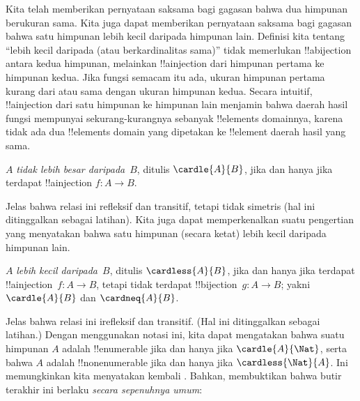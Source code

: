 \documentclass[../../../include/open-logic-section]{subfiles}
\begin{document}


\begin{explain}
Kita telah memberikan pernyataan saksama bagi gagasan bahwa dua himpunan
berukuran sama. Kita juga dapat memberikan pernyataan saksama bagi gagasan
bahwa satu himpunan lebih kecil daripada himpunan lain. Definisi kita tentang
``lebih kecil daripada (atau berkardinalitas sama)'' tidak memerlukan
!!a{bijection} antara kedua himpunan, melainkan !!a{injection} dari himpunan
pertama ke himpunan kedua. Jika fungsi semacam itu ada, ukuran himpunan pertama
kurang dari atau sama dengan ukuran himpunan kedua. Secara intuitif,
!!a{injection} dari satu himpunan ke himpunan lain menjamin bahwa daerah hasil
fungsi mempunyai sekurang-kurangnya sebanyak !!{element}s domainnya, karena
tidak ada dua !!{element}s domain yang dipetakan ke !!{element} daerah hasil
yang sama.
\end{explain}

\begin{defn}
$A$ \emph{tidak lebih besar daripada}~$B$, ditulis $\cardle{A}{B}$, jika dan
hanya jika terdapat !!a{injection} $f \colon A \to B$.
\end{defn}

Jelas bahwa relasi ini refleksif dan transitif, tetapi tidak simetris (hal ini
ditinggalkan sebagai latihan). Kita juga dapat memperkenalkan suatu pengertian
yang menyatakan bahwa satu himpunan (secara ketat) lebih kecil daripada
himpunan lain.

\begin{defn}
$A$ \emph{lebih kecil daripada}~$B$, ditulis $\cardless{A}{B}$, jika dan hanya
jika terdapat !!a{injection}~$f\colon A \to B$, tetapi tidak terdapat
!!{bijection}~$g\colon A \to B$; yakni $\cardle{A}{B}$ dan
$\cardneq{A}{B}$.
\end{defn}

Jelas bahwa relasi ini irefleksif dan transitif. (Hal ini ditinggalkan sebagai
latihan.) Dengan menggunakan notasi ini, kita dapat mengatakan bahwa suatu
himpunan $A$ adalah !!{enumerable} jika dan hanya jika $\cardle{A}{\Nat}$,
serta bahwa $A$ adalah !!{nonenumerable} jika dan hanya jika
$\cardless{\Nat}{A}$. Ini memungkinkan kita menyatakan kembali
. Bahkan,
\citet{Cantor1892} membuktikan bahwa butir terakhir ini berlaku \emph{secara
sepenuhnya umum}:
\end{document}
